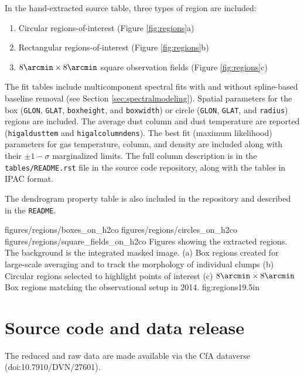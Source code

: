 In the hand-extracted source table, three types of region are included: 
\begin{enumerate}
    \item Circular regions-of-interest (Figure \ref{fig:regions}a)
    \item Rectangular regions-of-interest (Figure \ref{fig:regions}b)
    \item $8\arcmin \times 8\arcmin$ square observation fields (Figure \ref{fig:regions}c)
\end{enumerate}
The fit tables include multicomponent spectral fits with and without
spline-based baseline removal (see Section \ref{sec:spectralmodeling}).
Spatial parameters for the box (\texttt{GLON}, \texttt{GLAT},
\texttt{boxheight}, and \texttt{boxwidth}) or circle (\texttt{GLON},
\texttt{GLAT}, and \texttt{radius}) regions are included.  The average dust
column and dust temperature are reported (\texttt{higaldusttem} and
\texttt{higalcolumndens}).  The best fit (maximum likelihood) parameters for
gas temperature, \para column, and \hh density are included along with their
$\pm1-\sigma$ marginalized limits.  The full column description is in the
\texttt{tables/README.rst} file in the source code repository, along with the
tables in IPAC format.

The dendrogram property table is also included in the repository and described
in the \texttt{README}.

\RotFigureThreeAA
{figures/regions/boxes_on_h2co}
{figures/regions/circles_on_h2co}
{figures/regions/square_fields_on_h2co}
{Figures showing the extracted regions.  The background is the integrated
masked \para \threeohthree image. (a) Box regions created for large-scale averaging
and to track the morphology of individual clumps  (b) Circular regions selected
to highlight points of interest (c) $8\arcmin \times 8\arcmin$ Box regions
matching the observational setup in 2014.}
{fig:regions}{1}{9.5in}

\section{Source code and data release}
The reduced and raw data are made available via the CfA dataverse
(doi:10.7910/DVN/27601).

